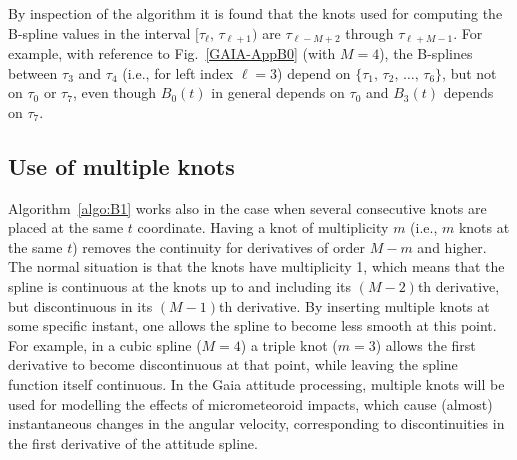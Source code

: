 \documentclass[structabstract]{aa}
\begin{document}
\begin{algorithm}[t]
\caption{For given spline order $M$, knot sequence $\{\tau_n\}$, time $t$, 
and left index $\ell$ (such that $\tau_\ell \le t < \tau_{\ell+1}$), this algorithm 
returns $\{ b_0\dots b_{M-1}\}$ such that $b_0=B_{\ell-M+1}(t)$, $\dots$, $b_{M-1}=B_{\ell}(t)$.}
\label{algo:B1}
\begin{algorithmic}[1]
  \ENDFOR
\ENDFOR
\end{algorithmic}
\end{algorithm}

By inspection of the algorithm it is found that the knots used for computing
the B-spline values in the interval $[\tau_\ell,\,\tau_{\ell+1})$ are
$\tau_{\ell-M+2}$ through $\tau_{\ell+M-1}$. For example, with reference
to Fig.~\ref{GAIA-AppB0} (with $M=4$), the B-splines between $\tau_3$ and $\tau_4$
(i.e., for left index $\ell=3$) depend on
$\{\tau_1,\,\tau_2,\,\dots,\,\tau_6\}$, but not on $\tau_0$ or
$\tau_7$, even though $B_0(t)$ in general depends on $\tau_0$
and $B_3(t)$ depends on $\tau_7$.


\subsection{Use of multiple knots}\label{sec:multknot}

Algorithm~\ref{algo:B1} works also in the case when several consecutive
knots are placed at the same $t$ coordinate. Having a knot of multiplicity
$m$ (i.e., $m$ knots at the same $t$) removes the continuity for derivatives
of order $M-m$ and higher. The normal situation is that the knots have
multiplicity 1, which means that the spline is continuous at the knots up to
and including its $(M-2)$th derivative, but discontinuous in its $(M-1)$th
derivative. By inserting multiple knots at some
specific instant, one allows the spline to become less smooth at this point.
For example, in a cubic spline ($M=4$) a triple knot ($m=3$) allows the
first derivative to become discontinuous at that point, while leaving the
spline function itself continuous. In the Gaia
attitude processing, multiple knots will be used for modelling the effects
of micrometeoroid impacts, which cause (almost) instantaneous changes in
the angular velocity, corresponding to discontinuities in the first derivative
of the attitude spline.
\end{document}
